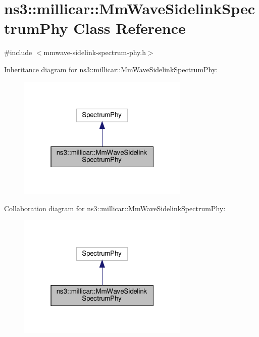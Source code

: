 \hypertarget{classns3_1_1millicar_1_1MmWaveSidelinkSpectrumPhy}{}\section{ns3\+:\+:millicar\+:\+:Mm\+Wave\+Sidelink\+Spectrum\+Phy Class Reference}
\label{classns3_1_1millicar_1_1MmWaveSidelinkSpectrumPhy}


{\ttfamily \#include $<$mmwave-\/sidelink-\/spectrum-\/phy.\+h$>$}



Inheritance diagram for ns3\+:\+:millicar\+:\+:Mm\+Wave\+Sidelink\+Spectrum\+Phy\+:\nopagebreak
\begin{figure}[H]
\begin{center}
\leavevmode
\includegraphics[width=232pt]{classns3_1_1millicar_1_1MmWaveSidelinkSpectrumPhy__inherit__graph}
\end{center}
\end{figure}


Collaboration diagram for ns3\+:\+:millicar\+:\+:Mm\+Wave\+Sidelink\+Spectrum\+Phy\+:\nopagebreak
\begin{figure}[H]
\begin{center}
\leavevmode
\includegraphics[width=232pt]{classns3_1_1millicar_1_1MmWaveSidelinkSpectrumPhy__coll__graph}
\end{center}
\end{figure}
